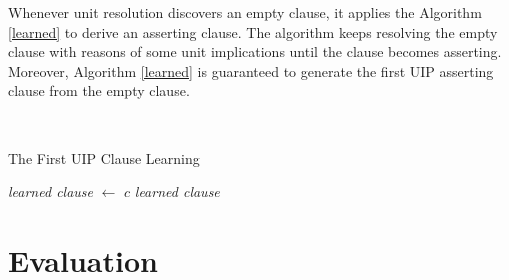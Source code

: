 \documentclass[11pt]{llncs}
\begin{document}
Whenever unit resolution discovers an empty clause, it applies the Algorithm \ref{learned} to derive an asserting clause. The algorithm keeps resolving the empty clause with reasons of some unit implications until the clause becomes asserting. Moreover, Algorithm \ref{learned} is guaranteed to generate the first UIP asserting clause from the empty clause.

\ \ 

\begin{algorithm}[H]
\label{learned}
\caption{The First UIP Clause Learning}


\BlankLine

\emph{learned clause} $\leftarrow$ $c$\;
\KwRet \emph{learned clause}
\end{algorithm}


\section{Evaluation}




\newpage
\end{document}
